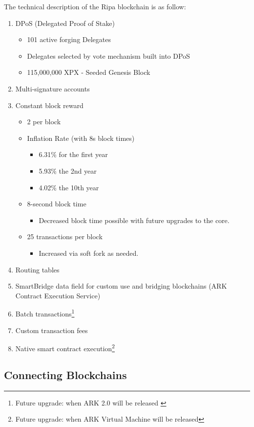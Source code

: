 \documentclass[11pt,fleqn,oneside]{book} %
\begin{document}
The technical description of the Ripa blockchain is as follow:
\begin{enumerate}
	\item DPoS (Delegated Proof of Stake)
	\begin{itemize}
		\item 101 active forging Delegates
		\item Delegates selected by vote mechanism built into DPoS
		\item 115,000,000 XPX - Seeded Genesis Block
	\end{itemize}
	\item Multi-signature accounts
	\item Constant block reward
	\begin{itemize}
		\item 2 \PHP per block
		\item Inflation Rate (with 8s block times)
		\begin{itemize}
			\item 6.31\% for the first year
			\item 5.93\% the 2nd year
			\item 4.02\% the 10th year
		\end{itemize}
		\item 8-second block time
		\begin{itemize}
			\item Decreased block time possible with future upgrades to the core.
		\end{itemize}
		\item 25 transactions per block
		\begin{itemize}
			\item Increased via soft fork as needed.
		\end{itemize}
	\end{itemize}
	\item Routing tables
	\item SmartBridge data field for custom use and bridging blockchains (ARK Contract Execution Service)
	\item Batch transactions\footnote{Future upgrade: when ARK 2.0 will be released \label{note1}}
	\item Custom transaction fees\footnotemark[\value{footnote}]
	\item Native smart contract execution\footnote{Future upgrade: when ARK Virtual Machine will be released}
\end{enumerate}

\subsection{Connecting Blockchains}
\end{document}
